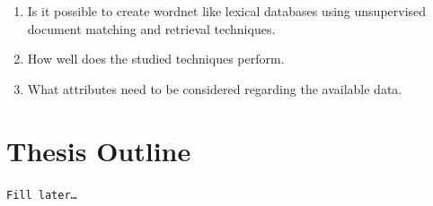 \begin{enumerate}
    \item Is it possible to create wordnet like lexical databases using unsupervised document matching and retrieval techniques.
    \item How well does the studied techniques perform.
    \item What attributes need to be considered regarding the available data.
\end{enumerate}

\section{Thesis Outline}%
\label{sec:thesis_outline}
\texttt{Fill later\ldots}
